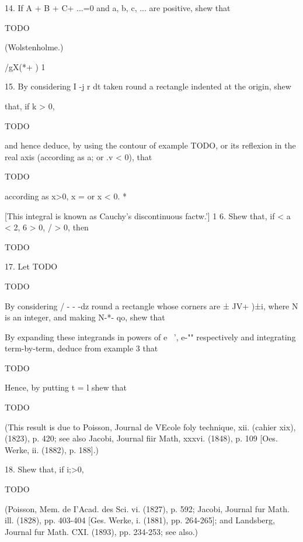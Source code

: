 \begin{enumerate}
14. If A + B + C+ ...=0 and a, b, c, ... are positive, shew that

TODO

(Wolstenholme.)

/gX(*+ )   1

15. By considering I -j r dt taken round a rectangle indented at the
origin, shew

that, if k > 0,

TODO

and hence deduce, by using the contour of  example TODO, or its
reflexion in the real axis (according as a; or .v < 0), that

TODO

according as x>0, x = or x < 0. *

[This integral is known as Cauchy's discontinuous factw.'] 1 6. Shew
that, if < a < 2, 6 > 0, / > 0, then

TODO

%
%

17. Let TODO

TODO

By considering / - - -dz round a rectangle whose corners are ± JV+
)±i, where N is an integer, and making N-*- qo, shew that

By expanding these integrands in powers of e~ ', e-"" respectively
and integrating term-by-term, deduce from example 3 that

TODO

Hence, by putting t = l shew that

TODO

(This result is due to Poisson, Journal de VEcole foly technique, xii.
(cahier xix), (1823), p. 420; see also Jacobi, Journal fiir Math,
xxxvi. (1848), p. 109 [Oes. Werke, ii. (1882), p. 188].) 

18. Shew that, if i;>0,

TODO

(Poisson, Mem. de I'Acad. des Sci. vi. (1827), p. 592; Jacobi,
Journal fur Math. ill. (1828), pp. 403-404 [Ges. Werke, i. (1881), pp.
264-265]; and Landsberg, Journal fur Math. CXI. (1893), pp. 234-253;
see also.)

\end{enumerate}